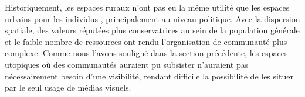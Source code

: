 Historiquement, les espaces ruraux n'ont pas eu la même utilité que les espaces urbains pour les individus \lgbt{}, principalement au niveau politique.
Avec la dispersion spatiale, des valeurs réputées plus conservatrices au sein de la population générale et le faible nombre de ressources ont rendu l'organisation de communauté \lgbt{} plus complexe.
Comme nous l'avons souligné dans la section précédente, les espaces utopiques où des communautés \lgbt{} auraient pu subsister n'auraient pas nécessairement besoin d'une visibilité, rendant difficile la possibilité de les situer par le seul usage de médias visuels.



